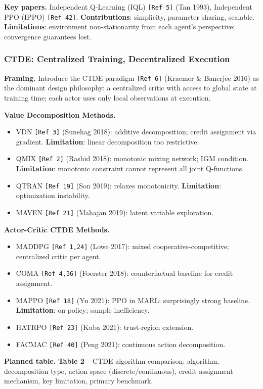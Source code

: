 \documentclass[12pt, a4paper]{article}
\begin{document}
\begin{outline_note}
\textbf{Key papers.}
Independent Q-Learning (IQL) \texttt{[Ref\,5]} (Tan 1993),
Independent PPO (IPPO) \texttt{[Ref\,42]}.
\textbf{Contributions}: simplicity, parameter sharing, scalable.
\textbf{Limitations}: environment non-stationarity from each agent's
perspective; convergence guarantees lost.
\end{outline_note}

\subsubsection{CTDE: Centralized Training, Decentralized Execution}

\begin{outline_note}
\textbf{Framing.}
Introduce the CTDE paradigm \texttt{[Ref\,6]} (Kraemer \& Banerjee 2016) as
the dominant design philosophy: a centralized critic with access to global
state at training time; each actor uses only local observations at
execution.

\textbf{Value Decomposition Methods.}
\begin{itemize}[nosep]
  \item VDN \texttt{[Ref\,3]} (Sunehag 2018): additive decomposition;
        credit assignment via gradient.
        \textbf{Limitation}: linear decomposition too restrictive.
  \item QMIX \texttt{[Ref\,2]} (Rashid 2018): monotonic mixing network;
        IGM condition.  \textbf{Limitation}: monotonic constraint
        cannot represent all joint Q-functions.
  \item QTRAN \texttt{[Ref\,19]} (Son 2019): relaxes monotonicity.
        \textbf{Limitation}: optimization instability.
  \item MAVEN \texttt{[Ref\,21]} (Mahajan 2019): latent variable
        exploration.
\end{itemize}

\textbf{Actor-Critic CTDE Methods.}
\begin{itemize}[nosep]
  \item MADDPG \texttt{[Ref\,1,24]} (Lowe 2017): mixed cooperative-competitive;
        centralized critic per agent.
  \item COMA \texttt{[Ref\,4,36]} (Foerster 2018): counterfactual baseline
        for credit assignment.
  \item MAPPO \texttt{[Ref\,18]} (Yu 2021): PPO in MARL; surprisingly strong
        baseline.  \textbf{Limitation}: on-policy; sample inefficiency.
  \item HATRPO \texttt{[Ref\,23]} (Kuba 2021): trust-region extension.
  \item FACMAC \texttt{[Ref\,40]} (Peng 2021): continuous action
        decomposition.
\end{itemize}

\textbf{Planned table.}
\textbf{Table 2} -- CTDE algorithm comparison: algorithm, decomposition type,
action space (discrete/continuous), credit assignment mechanism,
key limitation, primary benchmark.
\end{outline_note}
\end{document}
